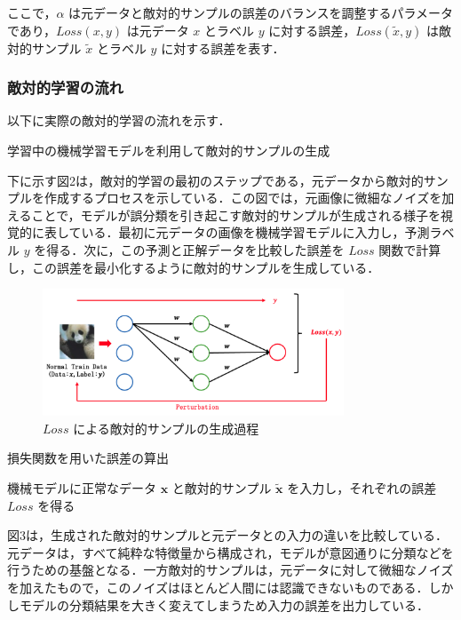 
ここで，$\alpha$ は元データと敵対的サンプルの誤差のバランスを調整するパラメータであり，$Loss(x,y)$ は元データ $x$ とラベル $y$ に対する誤差，$Loss(\tilde{x},y)$ は敵対的サンプル $\tilde{x}$ とラベル $y$ に対する誤差を表す．

\subsubsection{敵対的学習の流れ}
以下に実際の敵対的学習の流れを示す\cite{MBSD-AdversarialTraining}．

\begin{algorithm_step}

    \item[Step 1)] 学習中の機械学習モデルを利用して敵対的サンプルの生成

    下に示す図2は，敵対的学習の最初のステップである，元データから敵対的サンプルを作成するプロセスを示している．この図では，元画像に微細なノイズを加えることで，モデルが誤分類を引き起こす敵対的サンプルが生成される様子を視覚的に表している．最初に元データの画像を機械学習モデルに入力し，予測ラベル $y$ を得る．次に，この予測と正解データを比較した誤差を $Loss$ 関数で計算し，この誤差を最小化するように敵対的サンプルを生成している．
    
    \begin{figure}[H]
        \centering
        \includegraphics[width=0.8\textwidth]{images/敵対的学習1.png}
        \caption{ $Loss$ による敵対的サンプルの生成過程}
        \label{fig:adversarial_learning1}
    \end{figure}
    
    \item[Step 2)] 損失関数を用いた誤差の算出
    
    機械モデルに正常なデータ $\bm{x}$ と敵対的サンプル $\bm{\tilde{x}}$ を入力し，それぞれの誤差 $Loss$ を得る

    図3は，生成された敵対的サンプルと元データとの入力の違いを比較している．元データは，すべて純粋な特徴量から構成され，モデルが意図通りに分類などを行うための基盤となる．一方敵対的サンプルは，元データに対して微細なノイズを加えたもので，このノイズはほとんど人間には認識できないものである．しかしモデルの分類結果を大きく変えてしまうため入力の誤差を出力している．


\end{algorithm_step}
